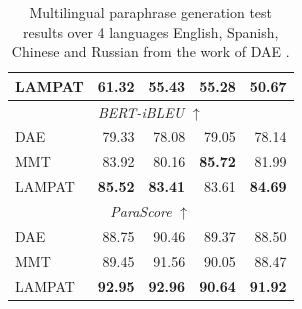 \documentclass[letterpaper]{article} %
\begin{document}
\begin{table}[h!]
\begin{tabular}{|l|rrrr|}
LAMPAT                   & \textbf{61.32}                  & \textbf{55.43}                  & \textbf{55.28}                  & \textbf{50.67}                  \\ \hline
\multicolumn{5}{|c|}{\textit{BERT-iBLEU} $\uparrow$}                                                                                                                                                     \\ \hline
DAE                           & 79.33                           & 78.08                           & 79.05                           & 78.14                            \\
MMT                         & 83.92                           & 80.16                           & \textbf{85.72}                           & 81.99                            \\
LAMPAT                   & \textbf{85.52}                  & \textbf{83.41}                  & 83.61                  & \textbf{84.69}                   \\ \hline
\multicolumn{5}{|c|}{\textit{ParaScore} $\uparrow$}                                                                                                                                 \\ \hline
DAE                           & 88.75                           & 90.46                           & 89.37                           & 88.50                           \\
MMT                         & 89.45                           & 91.56                           & 90.05                           & 88.47                           \\
LAMPAT                   & \textbf{92.95}                  & \textbf{92.96}                  & \textbf{90.64}                  & \textbf{91.92}    \\\hline             
\end{tabular}
\caption{Multilingual paraphrase generation test results over 4 languages English, Spanish, Chinese and Russian from the work of DAE \citep{guo2019zeroshot}.}
\label{tab:main_result}
\end{table}
\end{document}
